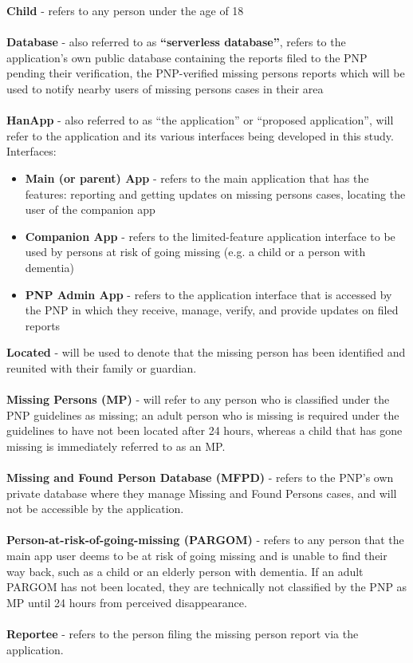 \textbf{Child} - refers to any person under the age of 18 \\ \\ 
\textbf{Database} - also referred to as \textbf{“serverless database”}, refers to the application’s own public database containing the reports filed to the PNP pending their verification, the PNP-verified missing persons reports which will be used to notify nearby users of missing persons cases in their area \\ \\
\textbf{HanApp} - also referred to as “the application” or “proposed application”, will refer to the application and its various interfaces being developed in this study. Interfaces:
\begin{itemize}
    \item \textbf{Main (or parent) App} - refers to the main application that has the features: reporting and getting updates on missing persons cases, locating the user of the companion app
    \item \textbf{Companion App} - refers to the limited-feature application interface to be used by persons at risk of going missing (e.g. a child or a person with dementia)
    \item \textbf{PNP Admin App} - refers to the application interface that is accessed by the PNP in which they receive, manage, verify, and provide updates on filed reports
\end{itemize}
\textbf{Located} - will be used to denote that the missing person has been identified and reunited with their family or guardian.\\\\
\textbf{Missing Persons (MP)} - will refer to any person who is classified under the PNP guidelines as missing; an adult person who is missing is required under the guidelines to have not been located after 24 hours, whereas a child that has gone missing is immediately referred to as an MP.\\\\
\textbf{Missing and Found Person Database (MFPD)} - refers to the PNP’s own private database where they manage Missing and Found Persons cases, and will not be accessible by the application.\\\\
\textbf{Person-at-risk-of-going-missing (PARGOM)} - refers to any person that the main app user deems to be at risk of going missing and is unable to find their way back, such as a child or an elderly person with dementia. If an adult PARGOM has not been located, they are technically not classified by the PNP as MP until 24 hours from perceived disappearance.\\\\
\textbf{Reportee} - refers to the person filing the missing person report via the application.


